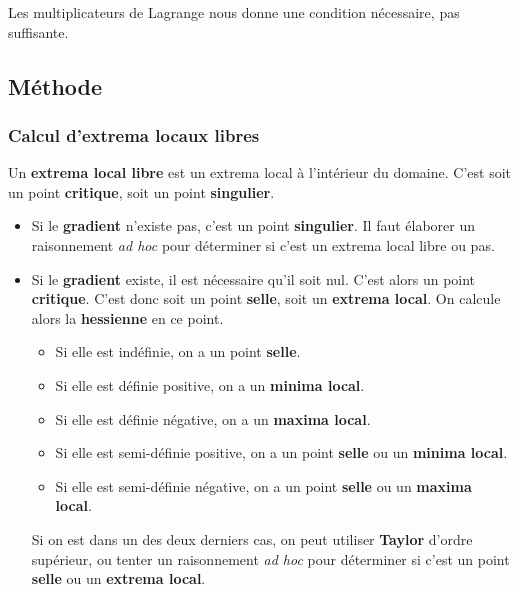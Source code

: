 \begin{myrem}
	Les multiplicateurs de Lagrange nous donne une condition nécessaire, pas suffisante.
\end{myrem}

\subsection{Méthode}

\subsubsection{Calcul d'extrema locaux libres}
Un \textbf{extrema local libre} est un extrema local à l'intérieur du domaine.
C'est soit un point \textbf{critique}, soit un point \textbf{singulier}.
\begin{itemize}
	\item Si le \textbf{gradient} n'existe pas, c'est un point \textbf{singulier}.
		Il faut élaborer un raisonnement \emph{ad hoc} pour déterminer si c'est un extrema local libre ou pas.
	\item Si le \textbf{gradient} existe, il est nécessaire qu'il soit nul.
		C'est alors un point \textbf{critique}.
		C'est donc soit un point \textbf{selle}, soit un \textbf{extrema local}.
		On calcule alors la \textbf{hessienne} en ce point.
		\begin{itemize}
			\item Si elle est indéfinie, on a un point \textbf{selle}.
			\item Si elle est définie positive, on a un \textbf{minima local}.
			\item Si elle est définie négative, on a un \textbf{maxima local}.
			\item Si elle est semi-définie positive, on a un point \textbf{selle} ou un \textbf{minima local}.
			\item Si elle est semi-définie négative, on a un point \textbf{selle} ou un \textbf{maxima local}.
		\end{itemize}
		Si on est dans un des deux derniers cas, on peut utiliser \textbf{Taylor} d'ordre supérieur, ou tenter un raisonnement \emph{ad hoc} pour déterminer si c'est un point \textbf{selle} ou un \textbf{extrema local}.
\end{itemize}

